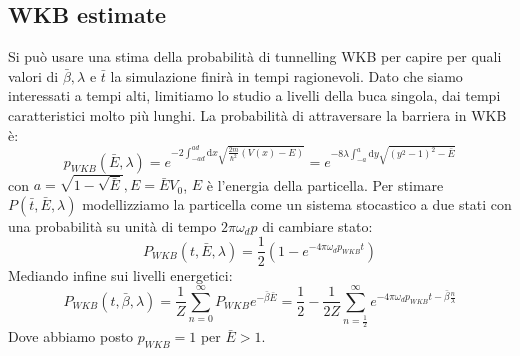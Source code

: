 \documentclass[italian]{article}
\newcommand{\dx}{\mathrm{d}x}
\newcommand{\dy}{\mathrm{d}y}
\begin{document}
	\subsection{WKB estimate}
	Si può usare una stima della probabilità di tunnelling WKB per capire per quali valori di $\bar{\beta}, \lambda$ e $\bar{t}$ la simulazione finirà in tempi ragionevoli.
	Dato che siamo interessati a tempi alti, limitiamo lo studio a livelli della buca singola, dai tempi caratteristici molto più lunghi.
	La probabilità di attraversare la barriera in WKB è:
	\begin{equation}
		p_{WKB}(\bar{E},\lambda)=e^{-2\int_{-ad}^{ad}\dx \sqrt{\frac{2m}{\hbar^2}(V(x)-E)}} =
		e^{-8\lambda\int_{-a}^{a} \dy \sqrt{\left(y^2 -1\right)^2 -\bar{E}}}
	\end{equation}
	con $a = \sqrt{1-\sqrt{\bar{E}}}, E = \bar{E}V_0$, $E$ è l'energia della particella. Per stimare $P(\bar{t},\bar{E}, \lambda)$ modellizziamo la particella come un sistema stocastico a due stati con una probabilità su unità di tempo $2\pi\omega_d p$ di cambiare stato:
	\begin{equation}
		P_{WKB}(t, \bar{E}, \lambda) = \frac{1}{2} \left(1-e^{-4\pi\omega_d p_{WKB} t}\right)
	\end{equation}
	Mediando infine sui livelli energetici:
	\begin{equation}
		P_{WKB}(t, \bar{\beta}, \lambda) = \frac{1}{Z} \sum_{n=0}^{\infty} P_{WKB} e^{-\bar{\beta}\bar{E}} =
		\frac{1}{2} - \frac{1}{2Z} \sum_{n=\frac{1}{2}}^{\infty}  e^{-4\pi\omega_d p_{WKB} t-\bar{\beta}\frac{n}{\lambda}}
	\end{equation}
	Dove abbiamo posto $p_{WKB} = 1$ per $\bar{E} > 1$.
\end{document}
